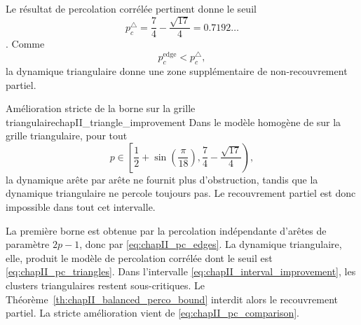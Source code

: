 Le résultat de percolation corrélée pertinent donne le seuil
\begin{equation}
    p_c^{\triangle}
    =
    \frac74-\frac{\sqrt{17}}4
    =0.7192\ldots
    \label{eq:chapII_pc_triangles}
\end{equation}
\cite{PercolationGrilleTrianglesCorrelations}. Comme
\begin{equation}
    p_c^{\mathrm{edge}}<p_c^{\triangle},
    \label{eq:chapII_pc_comparison}
\end{equation}
la dynamique triangulaire donne une zone supplémentaire de non-recouvrement partiel.

\begin{Corollaire}{Amélioration stricte de la borne sur la grille triangulaire}{chapII_triangle_improvement}
Dans le modèle homogène de \SB{} sur la grille triangulaire, pour tout
\begin{equation}
    p\in
    \left[
    \frac12+\sin\left(\frac\pi{18}\right),
    \frac74-\frac{\sqrt{17}}4
    \right),
    \label{eq:chapII_interval_improvement}
\end{equation}
la dynamique \SW{} arête par arête ne fournit plus d'obstruction, tandis que la dynamique triangulaire ne percole toujours pas. Le recouvrement partiel est donc impossible dans tout cet intervalle.
\end{Corollaire}

\begin{Preuve}
La première borne est obtenue par la percolation indépendante d'arêtes de paramètre $2p-1$, donc par \eqref{eq:chapII_pc_edges}. La dynamique triangulaire, elle, produit le modèle de percolation corrélée dont le seuil est \eqref{eq:chapII_pc_triangles}. Dans l'intervalle \eqref{eq:chapII_interval_improvement}, les clusters triangulaires restent sous-critiques. Le Théorème~\ref{th:chapII_balanced_perco_bound} interdit alors le recouvrement partiel. La stricte amélioration vient de \eqref{eq:chapII_pc_comparison}.
\end{Preuve}

